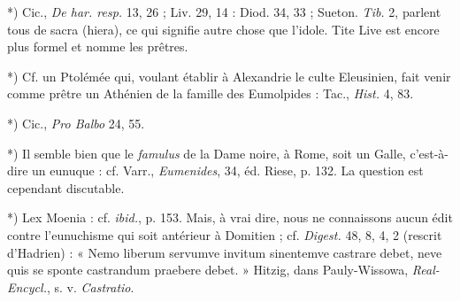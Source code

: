 \documentclass[a4paper, 11pt, oneside, polutonikogreek, french]{article}
\begin{document}
*) Cic., \emph{De har. resp.} 13, 26 ; Liv.  29, 14 : Diod. 34, 33 ; Sueton. \emph{Tib.} 2, parlent tous de sacra (hiera), ce qui signifie autre chose que l'idole. Tite Live est encore plus formel et nomme les prêtres.

*) Cf. un Ptolémée qui, voulant établir à Alexandrie le culte Eleusinien, fait venir comme prêtre un Athénien de la famille des Eumolpides : Tac., \emph{Hist.} 4, 83.

*) Cic., \emph{Pro Balbo} 24, 55.

*) Il semble bien que le \emph{famulus} de la Dame noire, à Rome, soit un Galle, c'est-à-dire un eunuque : cf. Varr., \emph{Eumenides}, 34, éd. Riese, p. 132. La question est cependant discutable.

*) Lex Moenia : cf. \emph{ibid.}, p. 153. Mais, à vrai dire, nous ne connaissons aucun édit contre l'eunuchisme qui soit antérieur à Domitien ; cf. \emph{Digest.} 48, 8, 4, 2 (rescrit d'Hadrien) : « Nemo liberum servumve invitum sinentemve castrare debet, neve quis se sponte castrandum praebere debet. » Hitzig, dans Pauly-Wissowa, \emph{Real-Encycl.}, s. v. \emph{Castratio}.
\end{document}
